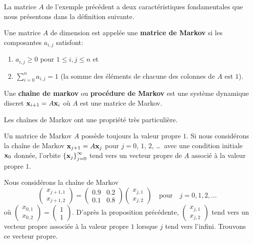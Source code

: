 {La matrice $A$ de l'exemple précédent a deux caractéristiques
fondamentales que nous présentons dans la définition suivante. 

\begin{defn}
Une matrice $A$ de dimension \nn est appelée une
{\bfseries matrice de Markov} si les
composantes $a_{i,j}$ satisfont:
\begin{enumerate}
\item $a_{i,j} \geq 0$ pour $1 \leq i, j \leq n$ et
\item $\displaystyle \sum_{i=0}^n a_{i,j} = 1$ (la somme des éléments
de chacune des colonnes de $A$ est $1$).
\end{enumerate}
Une {\bfseries chaîne de markov}
ou {\bfseries procédure de Markov} est une
système dynamique discret $\mathbf{x}_{i+1} = A \mathbf{x}_i$ où $A$ est une
matrice de Markov.
\end{defn}

Les chaînes de Markov ont une propriété très particulière.

\begin{prop} \label{alglinMarkoV}
Un matrice de Markov $A$ possède toujours la valeur propre $1$.  Si nous
considérons la chaîne de Markov $\mathbf{x}_{j+1} = A \mathbf{x}_j$ pour 
$j=0$, $1$, $2$, \ldots\ avec une condition initiale $\mathbf{x}_0$
donnée, l'orbite
$\displaystyle \left\{ \mathbf{x}_j \right\}_{j=0}^\infty$ tend
vers un vecteur propre de $A$ associé à la valeur propre $1$.
\end{prop}

\begin{egg}
Nous considérons la chaîne de Markov
\[
\begin{pmatrix} x_{j+1,1} \\ x_{j+1,2} \end{pmatrix} =
\begin{pmatrix} 0.9 & 0.2 \\ 0.1 & 0.8 \end{pmatrix}
\begin{pmatrix} x_{j,1} \\ x_{j,2} \end{pmatrix} \quad
\text{pour} \quad j=0,1,2,\ldots
\]
où $\displaystyle \begin{pmatrix} x_{0,1} \\ x_{0,2} \end{pmatrix} =
\begin{pmatrix} 1 \\ 1 \end{pmatrix}$.  D'après la proposition
précédente,
$\displaystyle \begin{pmatrix} x_{j,1} \\ x_{j,2} \end{pmatrix}$ tend vers un
vecteur propre associée à la valeur propre $1$ lorsque $j$ tend vers
l'infini.  Trouvons ce vecteur propre.


\end{egg}}

